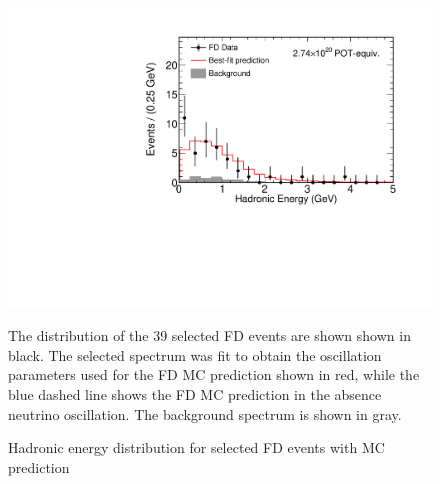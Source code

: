 \begin{figure}
\begin{center}
\includegraphics[width=\textwidth]{figures/results/fd_data_mc_numi_plots/hadEshift_unblind.pdf}
\end{center}
\caption{ Hadronic energy distribution for selected FD events with MC prediction }{
The distribution of the 39 selected FD events are shown shown in black.
The selected spectrum was fit to obtain the oscillation parameters used
for the FD MC prediction shown in red, while
the blue dashed line shows the FD MC prediction in the absence neutrino
oscillation.
The background spectrum is shown in gray.
}
\label{hadEshift_unblind}

\end{figure}



